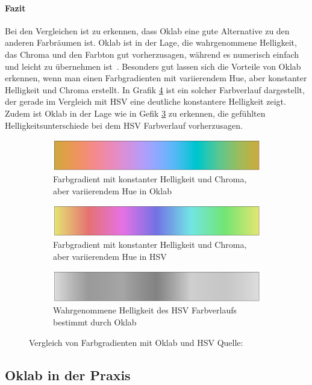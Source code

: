 \documentclass[12pt, a4paper, ngerman]{article}
\begin{document}
\paragraph{Fazit}
Bei den Vergleichen ist zu erkennen, dass Oklab eine gute Alternative zu den anderen Farbräumen ist.
Oklab ist in der Lage, die wahrgenommene Helligkeit, das Chroma und den Farbton gut vorherzusagen, 
während es numerisch einfach und leicht zu übernehmen ist~\cite{Oklab_2020}.
Besonders gut lassen sich die Vorteile von Oklab erkennen, 
wenn man einen Farbgradienten mit variierendem Hue, aber konstanter Helligkeit und Chroma erstellt. 
In Grafik \ref{fig:oklab_hsv} ist ein solcher Farbverlauf dargestellt, der gerade im Vergleich mit HSV eine deutliche konstantere Helligkeit zeigt. 
Zudem ist Oklab in der Lage wie in Gefik \ref{fig:hsv_lightness} zu erkennen, die gefühlten Helligkeitsunterschiede bei dem HSV Farbverlauf vorherzusagen.

\begin{figure}
  \centering
  \begin{subfigure}[b]{\linewidth}
  \centering
  \includegraphics[width=0.9\linewidth]{Grafiken/Oklab_HSV/hue_oklab.png}
  \caption{Farbgradient mit konstanter Helligkeit und Chroma, aber variierendem Hue in Oklab}
  \label{fig:hue_oklab}
  \end{subfigure}
  
  \begin{subfigure}[b]{\linewidth}
  \centering
  \includegraphics[width=0.9\linewidth]{Grafiken/Oklab_HSV/hue_hsv.png}
  \caption{Farbgradient mit konstanter Helligkeit und Chroma, aber variierendem Hue in HSV}
  \label{fig:hue_hsv}
  \end{subfigure}
  
  \begin{subfigure}[b]{\linewidth}
  \centering
  \includegraphics[width=0.9\linewidth]{Grafiken/Oklab_HSV/hue_hsv_lightness.png}
  \caption{Wahrgenommene Helligkeit des HSV Farbverlaufs bestimmt durch Oklab}
  \label{fig:hsv_lightness}
  \end{subfigure}
  
  \caption{Vergleich von Farbgradienten mit Oklab und HSV Quelle:~\cite{Oklab_2020}}
  \label{fig:oklab_hsv}
\end{figure}

\subsection{Oklab in der Praxis}

\newpage
\printbibliography
\end{document}
